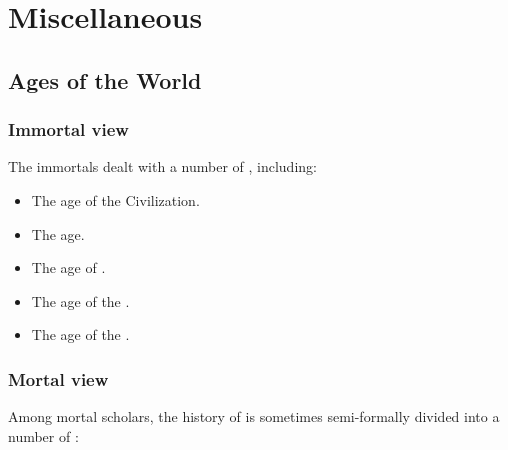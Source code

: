 \chapter{Miscellaneous}















\section{Ages of the World}









\subsection{Immortal view}
The immortals dealt with a number of , including:

\begin{itemize}
  \item The age of the \Ophidian Civilization.
  \item The  age.
  \item The age of .
  \item The age of the .
  \item The age of the . 
\end{itemize}










\subsection{Mortal view}
Among mortal scholars, the history of \Miith{} is sometimes semi-formally divided into a number of : 

